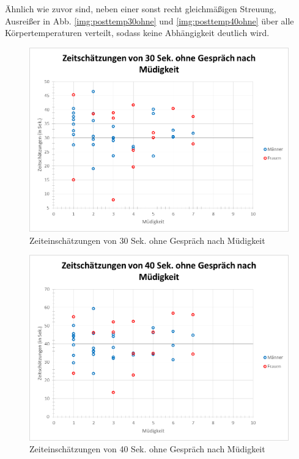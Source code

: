 \documentclass{Paper}
\begin{document}
Ähnlich wie zuvor sind, neben einer sonst recht gleichmäßigen Streuung, Ausreißer in Abb. \ref{img:posttemp30ohne} und \ref{img:posttemp40ohne} über alle Körpertemperaturen verteilt, sodass keine Abhängigkeit  deutlich wird. 


\begin{figure}[H]
	\centering
	\includegraphics[scale=0.7]{../Diagramme/scatterPost/30ohne_muedigkeit.png}
	\caption{Zeiteinschätzungen von 30 Sek. ohne Gespräch nach Müdigkeit}
	\label{img:postmued30ohne}
\end{figure}
\begin{figure}[H]
	\centering
	\includegraphics[scale=0.7]{../Diagramme/scatterPost/40ohne_muedigkeit.png}
	\caption{Zeiteinschätzungen von 40 Sek. ohne Gespräch nach Müdigkeit}
	\label{img:postmued40ohne}
\end{figure}
\end{document}
